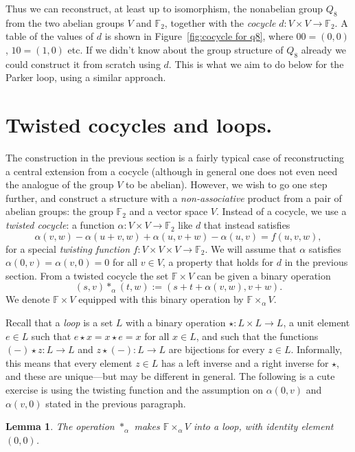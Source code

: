 \documentclass{article}
\theoremstyle{plain}
\newtheorem{lemma}{Lemma}
\theoremstyle{definition}
\def \FF {\mathbb{F}}
\begin{document}
Thus we can reconstruct, at least up to isomorphism, the nonabelian group $Q_8$ from the two abelian groups $V$ and $\FF_2$, together with the \emph{cocycle} $d\colon V\times V\to \FF_2$.
A table of the values of $d$ is shown in Figure~\ref{fig:cocycle for q8}, where $00=(0,0)$, $10 = (1,0)$ etc.
If we didn't know about the group structure of $Q_8$ already we could construct it from scratch using $d$.
This is what we aim to do below for the Parker loop, using a similar approach.


\section{Twisted cocycles and loops.}

The construction in the previous section is a fairly typical case of reconstructing a central extension from a cocycle (although in general one does not even need the analogue of the group $V$ to be abelian). 
However, we wish to go one step further, and construct a structure with a \emph{non-associative} product from a pair of abelian groups: the group $\FF_2$ and a vector space $V$.
Instead of a cocycle, we use a \emph{twisted cocycle}: a function $\alpha\colon V\times V \to \FF_2$ like $d$ that instead satisfies
\[
	\alpha(v,w)-\alpha(u+v,w)+\alpha(u,v+w)-\alpha(u,v) = f(u,v,w),
\]
for a special \emph{twisting function} $f\colon V\times V\times V \to \FF_2$. We will assume that $\alpha$ satisfies $\alpha(0,v)=\alpha(v,0) = 0$ for all $v\in V$, a property that holds for $d$ in the previous section. From a twisted cocycle the set $\FF \times V$ can be given a binary operation
\[
	(s,v)\ast_\alpha(t,w):=(s+ t+ \alpha(v,w),v+w).
\]
We denote $\FF \times V$ equipped with this binary operation by $\FF\times_\alpha V$.

Recall that a \emph{loop} is a set $L$ with a binary operation $\star\colon L\times L \to L$, a unit element $e\in L$ such that $e\star x = x \star e = x$ for all $x\in L$, and such that the functions $(-)\star z \colon L \to L$ and $z\star (-) \colon L \to L$ are bijections for every $z\in L$. Informally, this means that every element $z\in L$ has a left inverse and a right inverse for $\star$, and these are unique---but may be different in general. The following is a cute exercise is using the twisting function and the assumption on $\alpha(0,v)$ and $\alpha(v,0)$ stated in the previous paragraph.

\begin{lemma}
The operation $\ast_\alpha$ makes $\FF\times_\alpha V$ into a loop, with identity element $(0,0)$.
\end{lemma}
\end{document}
